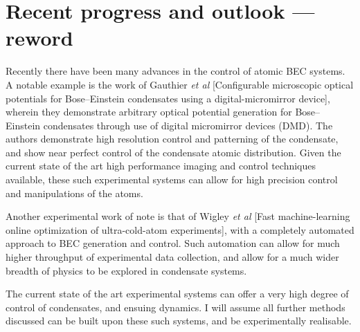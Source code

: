 \section{Recent progress and outlook --- reword}
Recently there have been many advances in the control of atomic BEC systems. A notable example is the work of Gauthier \textit{et al} [Configurable microscopic optical potentials for Bose--Einstein condensates using a digital-micromirror device], wherein they demonstrate arbitrary optical potential generation for Bose--Einstein condensates through use of digital micromirror devices (DMD). The authors demonstrate high resolution control and patterning of the condensate, and show near perfect control of the condensate atomic distribution. Given the current state of the art high performance imaging and control techniques available, these such experimental systems can allow for high precision control and manipulations of the atoms.

Another experimental work of note is that of Wigley \textit{et al} [Fast machine-learning online optimization of ultra-cold-atom experiments], with a completely automated approach to BEC generation and control. Such automation can allow for much higher throughput of experimental data collection, and allow for a much wider breadth of physics to be explored in condensate systems.

The current state of the art experimental systems can offer a very high degree of control of condensates, and ensuing dynamics. I will assume all further methods discussed can be built upon these such systems, and be experimentally realisable.

